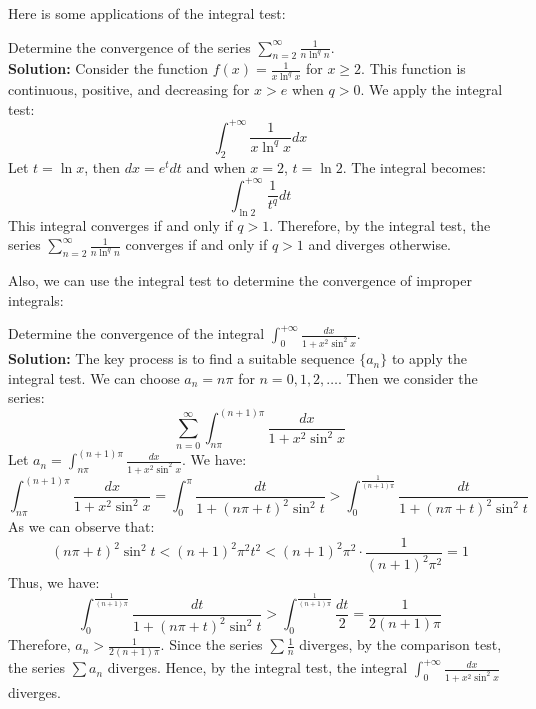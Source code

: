 Here is some applications of the integral test:

\begin{example}
    Determine the convergence of the series $\sum_{n=2}^{\infty} \frac{1}{n \ln^q n}$. \\
    \textbf{Solution:} Consider the function $f(x) = \frac{1}{x \ln^q x}$ for $x \ge 2$. This function is continuous, positive, and decreasing for $x > e$ when $q > 0$. We apply the integral test:
    \[\int_2^{+\infty} \frac{1}{x \ln^q x} dx \]
    Let $t = \ln x$, then $dx = e^t dt$ and when $x = 2$, $t = \ln 2$. The integral becomes:
    \[\int_{\ln 2}^{+\infty} \frac{1}{t^q} dt \]
    This integral converges if and only if $q > 1$. Therefore, by the integral test, the series $\sum_{n=2}^{\infty} \frac{1}{n \ln^q n}$ converges if and only if $q > 1$ and diverges otherwise.
\end{example}

Also, we can use the integral test to determine the convergence of improper integrals:



\begin{example}
    Determine the convergence of the integral $\int_{0}^{+\infty} \frac{dx}{1 + x^2 \sin^2 x}$. \\
    \textbf{Solution:} The key process is to find a suitable sequence $\{a_n\}$ to apply the integral test. We can choose $a_n = n\pi$ for $n = 0, 1, 2, \ldots$. Then we consider the series:
    \[\sum_{n=0}^{\infty} \int_{n\pi}^{(n+1)\pi} \frac{dx}{1 + x^2 \sin^2 x}\]
    Let $a_n = \int_{n\pi}^{(n+1)\pi} \frac{dx}{1 + x^2 \sin^2 x}$. We have:
    \[
    \int_{n\pi}^{(n+1)\pi} \frac{dx}{1 + x^2 \sin^2 x} = \int_{0}^{\pi} \frac{dt}{1 + (n\pi + t)^2 \sin^2 t} > \int_{0}^{\frac{1}{(n+1)\pi}} \frac{dt}{1 + (n\pi + t)^2 \sin^2 t}
    \]
    As we can observe that:
    \[
    (n\pi + t)^2 \sin^2 t < (n+1)^2 \pi^2 t^2 < (n+1)^2 \pi^2 \cdot \frac{1}{(n+1)^2 \pi^2} = 1
    \]
    Thus, we have:
    \[\int_{0}^{\frac{1}{(n+1)\pi}} \frac{dt}{1 + (n\pi + t)^2 \sin^2 t} > \int_{0}^{\frac{1}{(n+1)\pi}} \frac{dt}{2} = \frac{1}{2(n+1)\pi}\]
    Therefore, $a_n > \frac{1}{2(n+1)\pi}$. Since the series $\sum \frac{1}{n}$ diverges, by the comparison test, the series $\sum a_n$ diverges. Hence, by the integral test, the integral $\int_{0}^{+\infty} \frac{dx}{1 + x^2 \sin^2 x}$ diverges.
\end{example}



